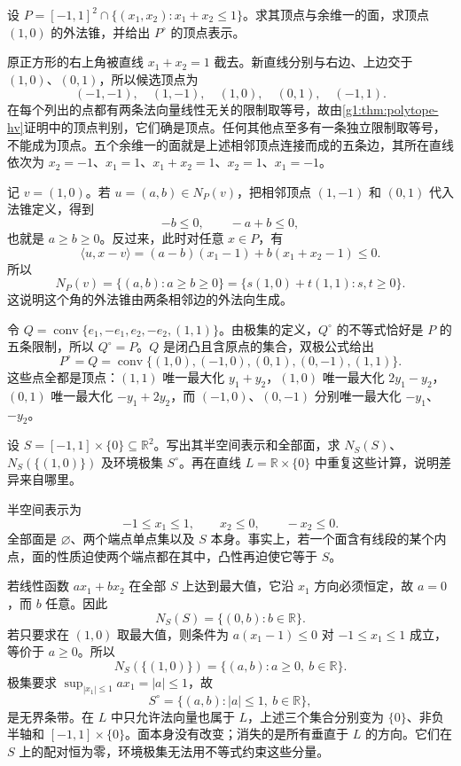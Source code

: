 \begin{exercise}
	\label{g1:exr:clipped-square}
	设 \(P=[-1,1]^2\cap\{(x_1,x_2):x_1+x_2\le1\}\)。求其顶点与余维一的面，求顶点 \((1,0)\) 的外法锥，并给出 \(P^\circ\) 的顶点表示。
\end{exercise}

\begin{solution}
	原正方形的右上角被直线 \(x_1+x_2=1\) 截去。新直线分别与右边、上边交于 \((1,0)\)、\((0,1)\)，所以候选顶点为
	\[
		(-1,-1),\quad (1,-1),\quad (1,0),\quad (0,1),\quad (-1,1).
	\]
	在每个列出的点都有两条法向量线性无关的限制取等号，故由\cref{g1:thm:polytope-hv}证明中的顶点判别，它们确是顶点。任何其他点至多有一条独立限制取等号，不能成为顶点。五个余维一的面就是上述相邻顶点连接而成的五条边，其所在直线依次为 \(x_2=-1\)、\(x_1=1\)、\(x_1+x_2=1\)、\(x_2=1\)、\(x_1=-1\)。

	记 \(v=(1,0)\)。若 \(u=(a,b)\in N_P(v)\)，把相邻顶点 \((1,-1)\) 和 \((0,1)\) 代入法锥定义，得到
	\[
		-b\le0,\qquad -a+b\le0,
	\]
	也就是 \(a\ge b\ge0\)。反过来，此时对任意 \(x\in P\)，有
	\[
		\langle u,x-v\rangle=(a-b)(x_1-1)+b(x_1+x_2-1)\le0.
	\]
	所以
	\[
		N_P(v)=\{(a,b):a\ge b\ge0\}=\{s(1,0)+t(1,1):s,t\ge0\}.
	\]
	这说明这个角的外法锥由两条相邻边的外法向生成。

	令 \(Q=\operatorname{conv}\{e_1,-e_1,e_2,-e_2,(1,1)\}\)。由极集的定义，\(Q^\circ\) 的不等式恰好是 \(P\) 的五条限制，所以 \(Q^\circ=P\)。\(Q\) 是闭凸且含原点的集合，双极公式给出
	\[
		P^\circ=Q=\operatorname{conv}\{(1,0),(-1,0),(0,1),(0,-1),(1,1)\}.
	\]
	这些点全都是顶点：\((1,1)\) 唯一最大化 \(y_1+y_2\)，\((1,0)\) 唯一最大化 \(2y_1-y_2\)，\((0,1)\) 唯一最大化 \(-y_1+2y_2\)，而 \((-1,0)\)、\((0,-1)\) 分别唯一最大化 \(-y_1\)、\(-y_2\)。
\end{solution}

\begin{exercise}
	\label{g1:exr:segment-ambient-polar}
	设 \(S=[-1,1]\times\{0\}\subseteq\mathbb R^2\)。写出其半空间表示和全部面，求 \(N_S(S)\)、\(N_S(\{(1,0)\})\) 及环境极集 \(S^\circ\)。再在直线 \(L=\mathbb R\times\{0\}\) 中重复这些计算，说明差异来自哪里。
\end{exercise}

\begin{solution}
	半空间表示为
	\[
		-1\le x_1\le1,\qquad x_2\le0,\qquad -x_2\le0.
	\]
	全部面是 \(\varnothing\)、两个端点单点集以及 \(S\) 本身。事实上，若一个面含有线段的某个内点，面的性质迫使两个端点都在其中，凸性再迫使它等于 \(S\)。

	若线性函数 \(ax_1+bx_2\) 在全部 \(S\) 上达到最大值，它沿 \(x_1\) 方向必须恒定，故 \(a=0\)，而 \(b\) 任意。因此
	\[
		N_S(S)=\{(0,b):b\in\mathbb R\}.
	\]
	若只要求在 \((1,0)\) 取最大值，则条件为 \(a(x_1-1)\le0\) 对 \(-1\le x_1\le1\) 成立，等价于 \(a\ge0\)。所以
	\[
		N_S(\{(1,0)\})=\{(a,b):a\ge0,\ b\in\mathbb R\}.
	\]
	极集要求 \(\sup_{|x_1|\le1}ax_1=|a|\le1\)，故
	\[
		S^\circ=\{(a,b):|a|\le1,\ b\in\mathbb R\},
	\]
	是无界条带。在 \(L\) 中只允许法向量也属于 \(L\)，上述三个集合分别变为 \(\{0\}\)、非负半轴和 \([-1,1]\times\{0\}\)。面本身没有改变；消失的是所有垂直于 \(L\) 的方向。它们在 \(S\) 上的配对恒为零，环境极集无法用不等式约束这些分量。
\end{solution}

